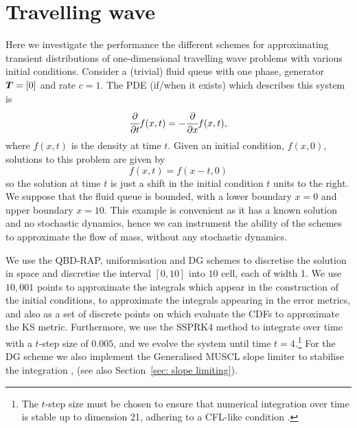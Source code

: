 \section{Travelling wave}\label{sec: wave num}
Here we investigate the performance the different schemes for approximating transient distributions of one-dimensional travelling wave problems with various initial conditions. Consider a (trivial) fluid queue with one phase, generator \(\boldsymbol T=[0]\) and rate \(c=1\). The PDE (if/when it exists) which describes this system is 
\[\cfrac{\partial}{\partial t} f(x,t) = -\cfrac{\partial}{\partial x} f(x,t),\]
where \(f(x,t)\) is the density at time \(t\). Given an initial condition, \(f(x,0)\), solutions to this problem are given by 
\[f(x,t) = f(x-t,0)\]
so the solution at time \(t\) is just a shift in the initial condition \(t\) units to the right. We suppose that the fluid queue is bounded, with a lower boundary \(x=0\) and upper boundary \(x=10\). This example is convenient as it has a known solution and no stochastic dynamics, hence we can instrument the ability of the schemes to approximate the flow of mass, without any stochastic dynamics. 

We use the QBD-RAP, uniformisation and DG schemes to discretise the solution in space and discretise the interval \([0,10]\) into \(10\) cell, each of width 1. We use \(10,001\) points to approximate the integrals which appear in the construction of the initial conditions, to approximate the integrals appearing in the error metrics, and also as a set of discrete points on which evaluate the CDFs to approximate the KS metric. Furthermore, we use the SSPRK4 method to integrate over time with a \(t\)-step size of \(0.005\), and we evolve the system until time \(t=4\).\footnote{The \(t\)-step size must be chosen to ensure that numerical integration over time is stable up to dimension 21, adhering to a CFL-like condition \cite[Section~4.8]{nodalDGBook}.} For the DG scheme we also implement the Generalised MUSCL slope limiter to stabilise the integration \citep{c99}, \citep[Section~5.6.2]{nodalDGBook} (see also Section~\ref{sec: slope limiting}). 

